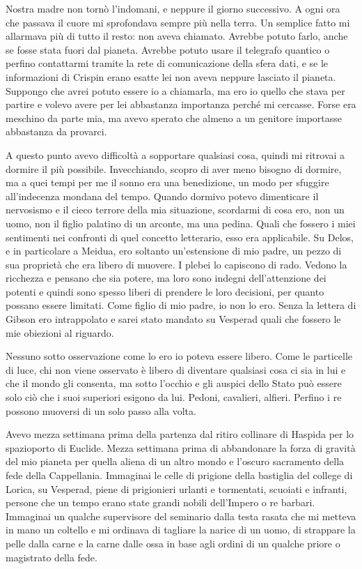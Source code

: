 Nostra madre non tornò l'indomani, e neppure il giorno successivo. A
ogni ora che passava il cuore mi sprofondava sempre più nella terra. Un
semplice fatto mi allarmava più di tutto il resto: non aveva chiamato.
Avrebbe potuto farlo, anche se fosse stata fuori dal pianeta. Avrebbe
potuto usare il telegrafo quantico o perfino contattarmi tramite la rete
di comunicazione della sfera dati, e se le informazioni di Crispin erano
esatte lei non aveva neppure lasciato il pianeta. Suppongo che avrei
potuto essere io a chiamarla, ma ero io quello che stava per partire e
volevo avere per lei abbastanza importanza perché mi cercasse. Forse era
meschino da parte mia, ma avevo sperato che almeno a un genitore
importasse abbastanza da provarci.

A questo punto avevo difficoltà a sopportare qualsiasi cosa, quindi mi
ritrovai a dormire il più possibile. Invecchiando, scopro di aver meno
bisogno di dormire, ma a quei tempi per me il sonno era una benedizione,
un modo per sfuggire all'indecenza mondana del tempo. Quando dormivo
potevo dimenticare il nervosismo e il cieco terrore della mia
situazione, scordarmi di cosa ero, non un uomo, non il figlio palatino
di un arconte, ma una pedina. Quali che fossero i miei sentimenti nei
confronti di quel concetto letterario, esso era applicabile. Su Delos, e
in particolare a Meidua, ero soltanto un'estensione di mio padre, un
pezzo di sua proprietà che era libero di muovere. I plebei lo capiscono
di rado. Vedono la ricchezza e pensano che sia potere, ma loro sono
indegni dell'attenzione dei potenti e quindi sono spesso liberi di
prendere le loro decisioni, per quanto possano essere limitati. Come
figlio di mio padre, io non lo ero. Senza la lettera di Gibson ero
intrappolato e sarei stato mandato su Vesperad quali che fossero le mie
obiezioni al riguardo.

Nessuno sotto osservazione come lo ero io poteva essere libero. Come le
particelle di luce, chi non viene osservato è libero di diventare
qualsiasi cosa ci sia in lui e che il mondo gli consenta, ma sotto
l'occhio e gli auspici dello Stato può essere solo ciò che i suoi
superiori esigono da lui. Pedoni, cavalieri, alfieri. Perfino i re
possono muoversi di un solo passo alla volta.

Avevo mezza settimana prima della partenza dal ritiro collinare di
Haspida per lo spazioporto di Euclide. Mezza settimana prima di
abbandonare la forza di gravità del mio pianeta per quella aliena di un
altro mondo e l'oscuro sacramento della fede della Cappellania.
Immaginai le celle di prigione della bastiglia del college di Lorica, su
Vesperad, piene di prigionieri urlanti e tormentati, scuoiati e
infranti, persone che un tempo erano state grandi nobili dell'Impero o
re barbari. Immaginai un qualche supervisore del seminario dalla testa
rasata che mi metteva in mano un coltello e mi ordinava di tagliare la
narice di un uomo, di strappare la pelle dalla carne e la carne dalle
ossa in base agli ordini di un qualche priore o magistrato della fede.

